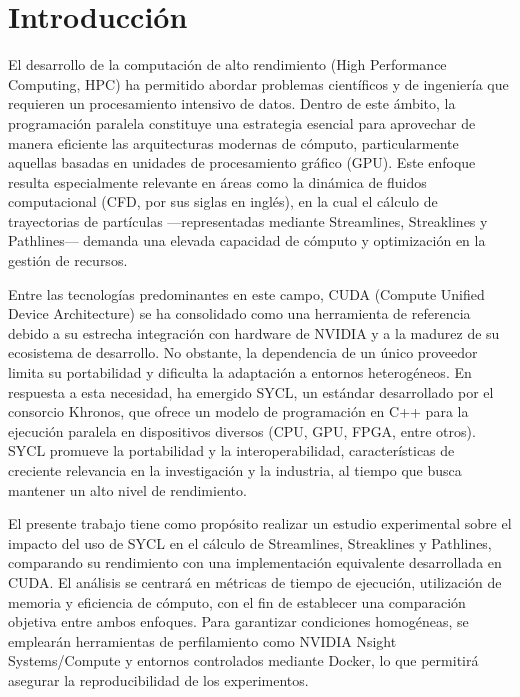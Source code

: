 \documentclass[12pt]{article}
\begin{document}


\justifying

\section{Introducción}

El desarrollo de la computación de alto rendimiento (High Performance Computing, HPC) ha permitido abordar problemas científicos y de ingeniería que requieren un procesamiento intensivo de datos. Dentro de este ámbito, la programación paralela constituye una estrategia esencial para aprovechar de manera eficiente las arquitecturas modernas de cómputo, particularmente aquellas basadas en unidades de procesamiento gráfico (GPU). Este enfoque resulta especialmente relevante en áreas como la dinámica de fluidos computacional (CFD, por sus siglas en inglés), en la cual el cálculo de trayectorias de partículas —representadas mediante Streamlines, Streaklines y Pathlines— demanda una elevada capacidad de cómputo y optimización en la gestión de recursos.


Entre las tecnologías predominantes en este campo, CUDA (Compute Unified Device Architecture) se ha consolidado como una herramienta de referencia debido a su estrecha integración con hardware de NVIDIA y a la madurez de su ecosistema de desarrollo. No obstante, la dependencia de un único proveedor limita su portabilidad y dificulta la adaptación a entornos heterogéneos. En respuesta a esta necesidad, ha emergido SYCL, un estándar desarrollado por el consorcio Khronos, que ofrece un modelo de programación en C++ para la ejecución paralela en dispositivos diversos (CPU, GPU, FPGA, entre otros). SYCL promueve la portabilidad y la interoperabilidad, características de creciente relevancia en la investigación y la industria, al tiempo que busca mantener un alto nivel de rendimiento.


El presente trabajo tiene como propósito realizar un estudio experimental sobre el impacto del uso de SYCL en el cálculo de Streamlines, Streaklines y Pathlines, comparando su rendimiento con una implementación equivalente desarrollada en CUDA. El análisis se centrará en métricas de tiempo de ejecución, utilización de memoria y eficiencia de cómputo, con el fin de establecer una comparación objetiva entre ambos enfoques. Para garantizar condiciones homogéneas, se emplearán herramientas de perfilamiento como NVIDIA Nsight Systems/Compute y entornos controlados mediante Docker, lo que permitirá asegurar la reproducibilidad de los experimentos.
\end{document}
